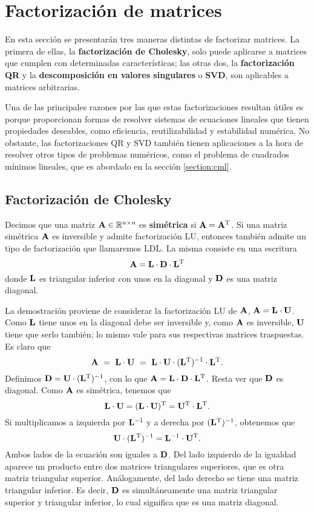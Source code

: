
\section{Factorización de matrices}
\label{section:factorizacion-matrices}

En esta sección se presentarán tres maneras distintas de factorizar matrices.
La primera de ellas, la \textbf{factorización de Cholesky}, solo puede
aplicarse a matrices que cumplen con determinadas características; las otras
dos, la \textbf{factorización QR} y la \textbf{descomposición en valores
singulares} o \textbf{SVD}, son aplicables a matrices arbitrarias.

Una de las principales razones por las que estas factorizaciones resultan
útiles es porque proporcionan formas de resolver sistemas de ecuaciones
lineales que tienen propiedades deseables, como eficiencia, reutilizabilidad
y estabilidad numérica. No obstante, las factorizaciones QR y SVD también
tienen aplicaciones a la hora de resolver otros tipos de problemas numéricos,
como el problema de cuadrados mínimos lineales, que es abordado en la
sección \ref{section:cml}.

\subsection{Factorización de Cholesky}

Decimos que una matriz $\mathbf{A} \in \mathbb{R}^{n \times n}$ es
\textbf{simétrica} si $\mathbf{A} = \mathbf{A}^{\mathrm{T}}$.
Si una matriz simétrica $\mathbf{A}$ es inversible y admite factorización LU,
entonces también admite un tipo de factorización que llamaremos LDL.
La misma consiste en una escritura
\[ \mathbf{A} = \mathbf{L} \cdot \mathbf{D} \cdot \mathbf{L}^{\mathrm{T}} \]
donde $\mathbf{L}$ es triangular inferior con unos en la diagonal y $\mathbf{D}$
es una matriz diagonal.

La demostración proviene de considerar la factorización LU de $\mathbf{A}$,
$\mathbf{A} = \mathbf{L} \cdot \mathbf{U}$. Como $\mathbf{L}$ tiene unos en la diagonal
debe ser inversible y, como $\mathbf{A}$ es inversible, $\mathbf{U}$ tiene que
serlo también; lo mismo vale para sus respectivas matrices traspuestas.
Es claro que 
\[ \mat{A} \ =\  \mat{L} \cdot \mat{U} \ =\ 
    \mat{L} \cdot \mat{U} \cdot (\mat{L}\trans)^{-1} \cdot \mat{L}\trans. \]
Definimos $\mathbf{D} = \mathbf{U} \cdot (\mathbf{L}^{\mathrm{T}})^{-1}$, con lo que
$\mathbf{A} = \mathbf{L} \cdot \mathbf{D} \cdot \mathbf{L}^{\mathrm{T}}$. Resta ver que $\mathbf{D}$
es diagonal. Como $\mathbf{A}$ es simétrica, tenemos que
\[ \mathbf{L} \cdot \mathbf{U} = (\mathbf{L} \cdot \mathbf{U})^{\mathrm{T}} =
    \mathbf{U}^{\mathrm{T}} \cdot \mathbf{L}^{\mathrm{T}}. \]
Si multiplicamos a izquierda por $\mathbf{L}^{-1}$ y a derecha por
$(\mathbf{L}^{\mathrm{T}})^{-1}$, obtenemos que
\[ \mathbf{U} \cdot (\mathbf{L}^{\mathrm{T}})^{-1} = \mathbf{L}^{-1} \cdot \mathbf{U}^{\mathrm{T}}. \]
Ambos lados de la ecuación son iguales a $\mathbf{D}$. Del lado izquierdo de la
igualdad aparece un producto entre dos matrices triangulares superiores, que
es otra matriz triangular superior. Análogamente, del lado derecho se tiene
una matriz triangular inferior. Es decir, $\mathbf{D}$ es simultáneamente una
matriz triangular superior y triangular inferior, lo cual significa que es
una matriz diagonal.

